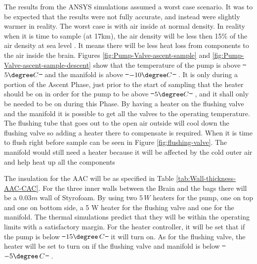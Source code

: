 \documentclass[a4paper,12pt,oneside]{article} %
\providecommand{\DIFaddtex}[1]{{\protect\color{blue}\uwave{#1}}} %
\providecommand{\DIFdeltex}[1]{{\protect\color{red}\sout{#1}}}                      %
\providecommand{\DIFaddbegin}{} %
\providecommand{\DIFaddend}{} %
\providecommand{\DIFdelbegin}{} %
\providecommand{\DIFdelend}{} %
\providecommand{\DIFadd}[1]{\texorpdfstring{\DIFaddtex{#1}}{#1}} %
\providecommand{\DIFdel}[1]{\texorpdfstring{\DIFdeltex{#1}}{}} %
\newcommand{\DIFscaledelfig}{0.5}
\newlength{\DIFdelgraphicswidth} %
\newlength{\DIFdelgraphicsheight} %
\newcommand{\DIFaddincludegraphics}[2][]{{\color{blue}\fbox{\DIFOincludegraphics[#1]{#2}}}} %
\newcommand{\DIFdelincludegraphics}[2][]{%
\sbox{\DIFdelgraphicsbox}{\DIFOincludegraphics[#1]{#2}}%
\settoboxwidth{\DIFdelgraphicswidth}{\DIFdelgraphicsbox} %
\settoboxtotalheight{\DIFdelgraphicsheight}{\DIFdelgraphicsbox} %
\scalebox{\DIFscaledelfig}{%
\parbox[b]{\DIFdelgraphicswidth}{\usebox{\DIFdelgraphicsbox}\\[-\baselineskip] \rule{\DIFdelgraphicswidth}{0em}}\llap{\resizebox{\DIFdelgraphicswidth}{\DIFdelgraphicsheight}{%
\setlength{\unitlength}{\DIFdelgraphicswidth}%
\begin{picture}(1,1)%
\thicklines\linethickness{2pt} %
{\color[rgb]{1,0,0}\put(0,0){\framebox(1,1){}}}%
{\color[rgb]{1,0,0}\put(0,0){\line( 1,1){1}}}%
{\color[rgb]{1,0,0}\put(0,1){\line(1,-1){1}}}%
\end{picture}%
}\hspace*{3pt}}} %
} %
\DeclareRobustCommand{\DIFaddbegin}{\DIFOaddbegin \let\includegraphics\DIFaddincludegraphics} %
\DeclareRobustCommand{\DIFaddend}{\DIFOaddend \let\includegraphics\DIFOincludegraphics} %
\DeclareRobustCommand{\DIFdelbegin}{\DIFOdelbegin \let\includegraphics\DIFdelincludegraphics} %
\DeclareRobustCommand{\DIFdelend}{\DIFOaddend \let\includegraphics\DIFOincludegraphics} %
\begin{document}
\begin{appendices}
The results from the ANSYS simulations assumed a worst case scenario. It was to be expected that the results were not fully accurate, and instead were slightly warmer in reality. The worst case is with air inside at normal density. In reality when it is time to sample (at 17km), the air density will be less then 15\% of the air density at sea level \cite{EngToolair}. It means there will be less heat loss from components to the air inside the brain. Figures \ref{fig:Pump-Valve-ascent-sample} and \ref{fig:Pump-Valve-ascent-sample-descent} show that the temperature of the pump is above \DIFdelbegin \DIFdel{\mbox{%
$5\degree C$
}%
}\DIFdelend \DIFaddbegin \DIFadd{\mbox{%
$5\degree{C}$
}%
}\DIFaddend and the manifold is above \DIFdelbegin \DIFdel{\mbox{%
$-10\degree C$
}%
}\DIFdelend \DIFaddbegin \DIFadd{\mbox{%
$-10\degree{C}$
}%
}\DIFaddend . It is only during a portion of the Ascent Phase, just prior to the start of sampling that the heater should be on in order for the pump to be above \DIFdelbegin \DIFdel{\mbox{%
$5\degree C$
}%
}\DIFdelend \DIFaddbegin \DIFadd{\mbox{%
$5\degree{C}$
}%
}\DIFaddend , and it shall only be needed to be on during this Phase. By having a heater on the flushing valve and the manifold it is possible to get all the valves to the operating temperature. The flushing tube that goes out to the open air outside will cool down the flushing valve so adding a heater there to compensate is required. When it is time to flush right before sample can be seen in Figure \ref{fig:flushing-valve}. The manifold would still need a heater because it will be affected by the cold outer air and help heat up all the components

The insulation for the AAC will be as specified in Table \ref{tab:Wall-thickness-AAC-CAC}. For the three inner walls between the Brain and the bags there will be a $0.03 m$ wall of Styrofoam. By using two $5\,W$ heaters for the pump, one on top and one on bottom side, a 5 W heater for the flushing valve and one for the manifold. The thermal simulations predict that they will be within the operating limits with a satisfactory margin. For the heater controller, it will be set that if the pump is below \DIFdelbegin \DIFdel{\mbox{%
$15\degree\,C$
}%
}\DIFdelend \DIFaddbegin \DIFadd{\mbox{%
$15\degree{C}$
}%
}\DIFaddend it will turn on. As for the flushing valve, the heater will be set to turn on if the flushing valve and manifold is below \DIFdelbegin \DIFdel{\mbox{%
$-5 \degree\,C$
}%
}\DIFdelend \DIFaddbegin \DIFadd{\mbox{%
$-5 \degree{C}$
}%
}\DIFaddend .


\end{appendices}
\end{document}
